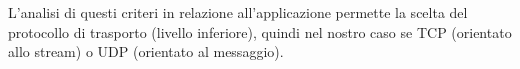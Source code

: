 \documentclass{article}
\begin{document}
L'analisi di questi criteri in relazione all'applicazione permette la scelta del protocollo di trasporto (livello inferiore), quindi nel nostro caso se TCP (orientato allo stream) o UDP (orientato al messaggio).

\newpage

\end{document}

